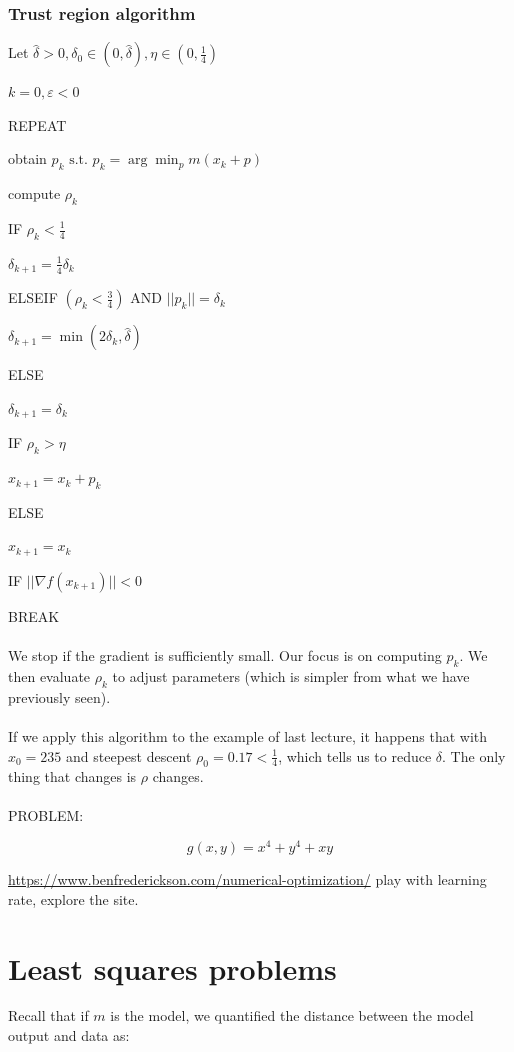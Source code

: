 \subsubsection{Trust region algorithm}

Let
$\hat{\delta}>0, \delta_0 \in (0,\hat{\delta}), \eta \in (0,\frac{1}{4})$

$k=0, \varepsilon < 0$

REPEAT

obtain $p_k \text{ s.t. } p_k=\arg \min_p m(x_k+p)$

compute $\rho_k$

IF $\rho_k < \frac{1}{4}$

$\delta_{k+1}=\frac{1}{4}\delta_k$

ELSEIF $(\rho_k < \frac{3}{4})$ AND $||p_k||=\delta_k$

$\delta_{k+1}=\min (2\delta_k, \hat{\delta})$

ELSE

$\delta_{k+1}=\delta_{k}$

IF $\rho_k > \eta$

$x_{k+1}= x_{k}+p_{k}$

ELSE

$x_{k+1}= x_{k}$

IF $||\nabla f(x_{k+1})||<0$

BREAK
\\
\\
\noindent
We stop if the gradient is sufficiently small. Our focus is on computing
$p_k$. We then evaluate $\rho_k$ to adjust parameters (which is simpler
from what we have previously seen).
\\
\\
\noindent
If we apply this algorithm to the example of last lecture, it happens
that with $x_0=235$ and steepest descent $\rho_0=0.17 < \frac{1}{4}$,
which tells us to reduce $\delta$. The only thing that changes is $\rho$
changes.
\\
\\
\noindent
PROBLEM:

$$
g(x,y)=x^4+y^4+xy
$$

\url{https://www.benfrederickson.com/numerical-optimization/} play with
learning rate, explore the site.


\section{Least squares problems}

Recall that if $m$ is the model, we quantified the distance between the
model output and data as:


